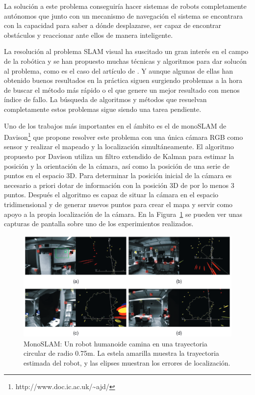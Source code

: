 La solución a este problema conseguiría hacer sistemas de robots completamente autónomos que junto con un mecanismo de navegación el sistema se encontrara con la capacidad para saber a dónde desplazarse, ser capaz de encontrar obstáculos y reaccionar ante ellos de manera inteligente.

La resolución al problema SLAM visual ha suscitado un gran interés en el campo de la robótica y se han propuesto muchas técnicas y algoritmos para dar solucón al problema, como es el caso del artículo de \cite{Reference1}. Y aunque algunas de ellas han obtenido buenos resultados en la práctica siguen surgiendo problemas a la hora de buscar el método más rápido o el que genere un mejor resultado con menos índice de fallo. La búsqueda de algoritmos y métodos que resuelvan completamente estos problemas sigue siendo una tarea pendiente.

Uno de los trabajos más importantes en el ámbito es el de monoSLAM de Davison\footnote{http://www.doc.ic.ac.uk/\textasciitilde ajd/} \parencite{Reference5} que propone resolver este problema con una única cámara RGB como sensor y realizar el mapeado y la localización simultáneamente. El algoritmo propuesto por Davison utiliza un filtro extendido de Kalman para estimar la posición y la orientación de la cámara, así como la posición de una serie de puntos en el espacio 3D. Para determinar la posición inicial de la cámara es necesario a priori dotar de información con la posición 3D de por lo menos 3 puntos. Después el algoritmo es capaz de situar la cámara en el espacio tridimensional y de generar nuevos puntos para crear el mapa y servir como apoyo a la propia localización de la cámara. En la Figura~\ref{fig:Monoslam} se pueden ver unas capturas de pantalla sobre uno de los experimientos realizados.

\begin{figure}[th]
\centering
\includegraphics[scale=0.35]{Figures/monoslam.png}
\decoRule
\caption[MonoSLAM]{MonoSLAM: Un robot humanoide camina en una trayectoria circular de radio 0.75m. La estela amarilla muestra la trayectoria estimada del robot, y las elipses muestran los errores de localización.}
\label{fig:Monoslam}
\end{figure}


